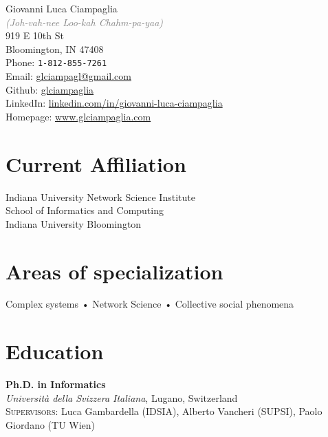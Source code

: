 \documentclass[10pt, letterpaper]{article}
\newcommand{\years}[1]{\marginnote{\small #1}}
\begin{document}
{\LARGE Giovanni Luca Ciampaglia}\\
\textcolor{gray}{\emph{(Joh-vah-nee Loo-kah Chahm-pa-yaa)}}\\[.75cm]
919 E 10th St \\
Bloomington, IN 47408\\
Phone: \texttt{1-812-855-7261}\\[.2cm]
Email: \href{mailto:gciampag@indiana.edu}{glciampagl@gmail.com}\\
Github: \href{http://github.com/glciampaglia}{glciampaglia}\\
LinkedIn: \href{http://linkedin.com/in/giovanni-luca-ciampaglia}{linkedin.com/in/giovanni-luca-ciampaglia}\\
Homepage: \href{http://www.glciampaglia.com/}{www.glciampaglia.com}\\[.2cm]

\section*{Current Affiliation}

Indiana University Network Science Institute\\
School of Informatics and Computing\\
Indiana University Bloomington

\section*{Areas of specialization}
Complex systems • Network Science • Collective social phenomena


\section*{Education}
\noindent

\years{2012}\textbf{Ph.D. in Informatics}\\
%
\textsl{Università della Svizzera Italiana}, Lugano, Switzerland\\
%
\textsc{Supervisors}: Luca Gambardella (IDSIA), Alberto Vancheri (SUPSI), Paolo
Giordano (TU Wien)\\[1em]
\end{document}
